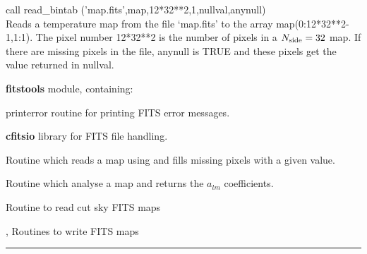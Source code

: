 \begin{example}
{
call read\_bintab ('map.fits',map,12*32**2,1,nullval,anynull)  \\
}
{
Reads a \healpix temperature map from the file `map.fits' to the array map(0:12*32**2-1,1:1). The pixel number 12*32**2 is the number of pixels in a ${N_{\rm side}}=32$ \healpix map. If there are missing pixels in the file, anynull is TRUE and these pixels get the value returned in nullval. 
}
\end{example}

\begin{modules}
  \begin{sulist}{} %
  \item[\textbf{fitstools}] module, containing:
  \item[printerror] routine for printing FITS error messages.
  \item[\textbf{cfitsio}] library for FITS file handling.		
  \end{sulist}
\end{modules}

\begin{related}
  \begin{sulist}{} %
  \item[\htmlref{input\_map}{sub:input_map}] Routine which reads a map using \thedocid and fills missing pixels with a given value.
  \item[\htmlref{map2alm}{sub:map2alm}] Routine which analyse a map and returns the $a_{lm}$
  coefficients.
  \item[\htmlref{read\_fits\_cut4}{sub:read_fits_cut4}] Routine to read cut sky \healpix FITS maps
  \item[\htmlref{write\_plm}{sub:write_plm}, \htmlref{write\_bintab}{sub:write_bintab}] Routines to write \healpix FITS maps
  \end{sulist}
\end{related}

\rule{\hsize}{2mm}

\newpage
